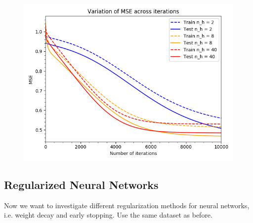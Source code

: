 \documentclass[a4paper]{article}
\begin{document}
\begin{enumerate}[label=(\alph*)]
\begin{itemize}
\begin{figure}[htp]
\begin{minipage}{0.4\textwidth}
  \includegraphics[scale=0.35]{plots/11d_sgd.png}
  \label{plot_simple_nh40}
\end{minipage}
\end{figure}

\end{itemize}         
\end{enumerate}

\newpage

\subsection{Regularized Neural Networks}
Now we want to investigate different regularization methods for neural networks, i.e. weight decay and early stopping. Use the same dataset as before.
\end{document}
